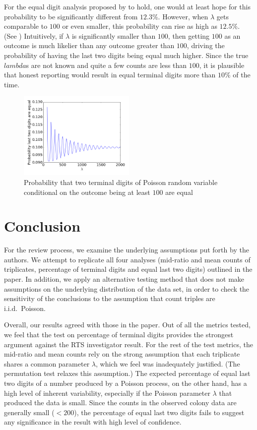 \documentclass[11pt]{article}
\begin{document}
For the equal digit analysis proposed by \citet{Pitt:2016cu} to hold, one would at least hope for this probability to be significantly different from $12.3\%$. However, when $\lambda$ gets comparable to $100$ or even smaller, this probability can rise as high as $12.5\%$. (See ) Intuitively, if $\lambda$ is significantly smaller than $100$, then getting $100$ as an outcome is much likelier than any outcome greater than $100$, driving the probability of having the last two digits being equal much higher. Since the true $lambda$s are not known and quite a few counts are less than $100$, it is plausible that honest reporting would result in equal terminal digits more than $10\%$ of the time.

\begin{figure}[htbp]
    \centering
    \includegraphics[width=0.5\textwidth]{term_2dig}
    \caption{Probability that two terminal digits of Poisson random variable conditional on the outcome being at least $100$ are equal}
    \label{fig:term_2dig}
\end{figure}

\section{Conclusion}

For the review process, we examine the underlying assumptions put forth by the authors. We attempt to replicate all four analyses (mid-ratio and mean counts of triplicates,  percentage of terminal digits and equal last two digits) outlined in the paper. In addition, we apply an alternative testing method that does not make assumptions on the underlying distribution of the data set, in order to check the sensitivity of the conclusions to the assumption that count triples are i.i.d.\ Poisson. 

Overall, our results agreed with those in the paper. Out of all the metrics tested, we feel that the test on percentage of terminal digits provides the strongest argument against the RTS investigator result. For the rest of the test metrics, the mid-ratio and mean counts rely on the strong assumption that each triplicate shares a common parameter $\lambda$, which we feel was inadequately justified. (The permutation test relaxes this assumption.) The expected percentage of equal last two digits of a number produced by a Poisson process, on the other hand, has a high level of inherent variability, especially if the Poisson parameter $\lambda$ that produced the data is small. Since the counts in the observed colony data are generally small ($< 200$), the percentage of equal last two digits fails to suggest any significance in the result with high level of confidence.
\end{document}
